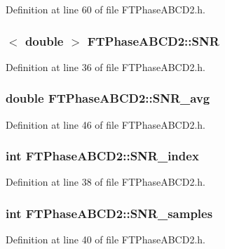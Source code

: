 Definition at line 60 of file FTPhaseABCD2.h.

\hypertarget{classFTPhaseABCD2_a38653f47e520c8a1ea7c3eee88b300c8}{
\subsubsection[{SNR}]{$<$ double $>$ {\bf FTPhaseABCD2::SNR}}}
\label{classFTPhaseABCD2_a38653f47e520c8a1ea7c3eee88b300c8}


Definition at line 36 of file FTPhaseABCD2.h.

\hypertarget{classFTPhaseABCD2_afb90442f695d6cf1dc5b09ea14ef8c5e}{
\subsubsection[{SNR\_\-avg}]{\setlength{\rightskip}{0pt plus 5cm}double {\bf FTPhaseABCD2::SNR\_\-avg}}}
\label{classFTPhaseABCD2_afb90442f695d6cf1dc5b09ea14ef8c5e}


Definition at line 46 of file FTPhaseABCD2.h.

\hypertarget{classFTPhaseABCD2_aa9157905b1eb76f63e4fc0ef853af13b}{
\subsubsection[{SNR\_\-index}]{\setlength{\rightskip}{0pt plus 5cm}int {\bf FTPhaseABCD2::SNR\_\-index}}}
\label{classFTPhaseABCD2_aa9157905b1eb76f63e4fc0ef853af13b}


Definition at line 38 of file FTPhaseABCD2.h.

\hypertarget{classFTPhaseABCD2_aef1a8f3c2bfcedfc10876490fb4bb455}{
\subsubsection[{SNR\_\-samples}]{\setlength{\rightskip}{0pt plus 5cm}int {\bf FTPhaseABCD2::SNR\_\-samples}}}
\label{classFTPhaseABCD2_aef1a8f3c2bfcedfc10876490fb4bb455}


Definition at line 40 of file FTPhaseABCD2.h.

